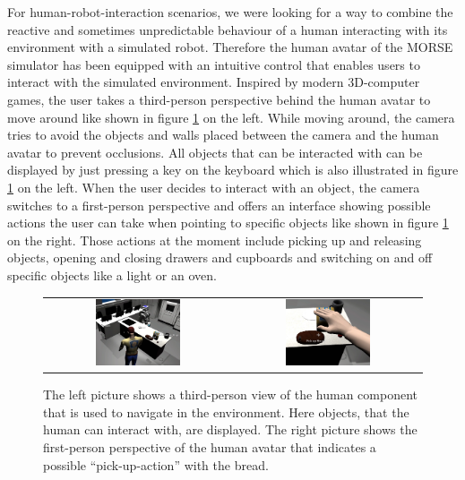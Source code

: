 \documentclass{llncs}
\begin{document}
For human-robot-interaction scenarios, we were looking for a way to combine the
reactive and sometimes unpredictable behaviour of a human interacting with its
environment with a simulated robot. Therefore the human avatar of the MORSE
simulator has been equipped with an intuitive 
control that enables users to interact with the simulated environment. Inspired
by modern 3D-computer games, the user takes a third-person perspective behind
the human avatar to move around like shown in figure \ref{fig:human_control} on
the left. 
While moving around, the camera tries to avoid the objects and walls placed
between the camera and the human avatar to prevent occlusions.  All objects
that can be interacted with can be displayed by just pressing a key on the
keyboard which is also illustrated in figure \ref{fig:human_control} on the
left. When the user decides to interact with an object, the camera switches to
a first-person perspective and offers an interface showing possible actions the
user can take when pointing to specific objects like shown in figure
\ref{fig:human_control} on the right. Those actions at the moment include
picking up and releasing objects, opening and closing drawers and cupboards and
switching on and off specific objects like a light or an oven. 

\begin{figure}[h!]
\centering
\begin{tabular}{cc}
 \includegraphics[width=0.475\textwidth]{pics/human_control_1.png} &
 \includegraphics[width=0.475\textwidth]{pics/human_control_2.png}
\end{tabular}
\caption{The left picture shows a third-person view of the human component that
    is used to navigate in the environment. Here objects, that the human can
    interact with, are displayed. The right picture shows the first-person
    perspective of the human avatar that indicates a possible
    ``pick-up-action'' with the bread.}
\label{fig:human_control}
\end{figure}
\end{document}
